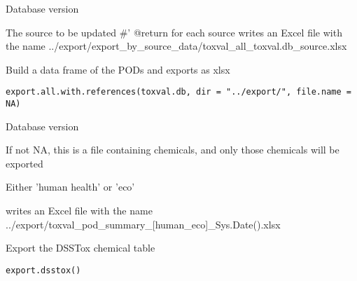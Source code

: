 \documentclass[letterpaper]{book}
\begin{document}
%
\begin{Arguments}
\begin{ldescription}
\item[\code{toxval.db}] Database version

\item[\code{source}] The source to be updated
\#' @return for each source writes an Excel file with the name
../export/export\_by\_source\_data/toxval\_all\_toxval.db\_source.xlsx
\end{ldescription}
\end{Arguments}
%
\begin{Description}\relax
Build a data frame of the PODs and exports as xlsx
\end{Description}
%
\begin{Usage}
\begin{verbatim}
export.all.with.references(toxval.db, dir = "../export/", file.name = NA)
\end{verbatim}
\end{Usage}
%
\begin{Arguments}
\begin{ldescription}
\item[\code{toxval.db}] Database version

\item[\code{file.name}] If not NA, this is a file containing chemicals, and only those chemicals will be exported

\item[\code{human\_eco}] Either 'human health' or 'eco'
\end{ldescription}
\end{Arguments}
%
\begin{Value}
writes an Excel file with the name
../export/toxval\_pod\_summary\_[human\_eco]\_Sys.Date().xlsx
\end{Value}
%
\begin{Description}\relax
Export the DSSTox chemical table
\end{Description}
%
\begin{Usage}
\begin{verbatim}
export.dsstox()
\end{verbatim}
\end{Usage}
\end{document}
